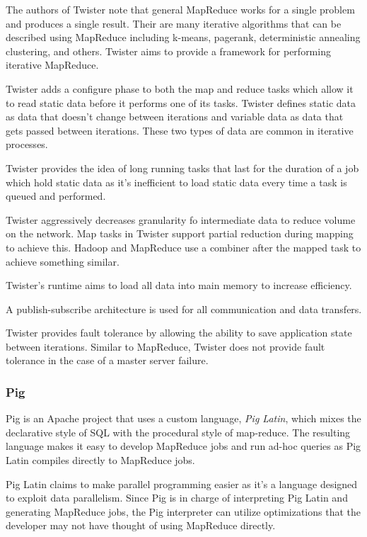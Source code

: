 \documentclass[]{article}
\begin{document}
The authors of Twister note that general MapReduce works for a single problem and produces a single result. Their are many iterative algorithms that can be described using MapReduce including k-means, pagerank, deterministic annealing clustering, and others. Twister aims to provide a framework for performing iterative MapReduce.

Twister adds a configure phase to both the map and reduce tasks which allow it to read static data before it performs one of its tasks. Twister defines static data as data that doesn't change between iterations and variable data as data that gets passed between iterations. These two types of data are common in iterative processes.

Twister provides the idea of long running tasks that last for the duration of a job which hold static data as it's inefficient to load static data every time a task is queued and performed.

Twister aggressively decreases granularity fo intermediate data to reduce volume on the network. Map tasks in Twister support partial reduction during mapping to achieve this. Hadoop and MapReduce use a combiner after the mapped task to achieve something similar.

Twister's runtime aims to load all data into main memory to increase efficiency.

A publish-subscribe architecture is used for all communication and data transfers.

Twister provides fault tolerance by allowing the ability to save application state between iterations. Similar to MapReduce, Twister does not provide fault tolerance in the case of a master server failure.

\subsubsection{Pig}\label{sssec:pig}
Pig\cite{olston2008pig} is an Apache project that uses a custom language, \textit{Pig Latin}, which mixes the declarative style of SQL with the procedural style of map-reduce. The resulting language makes it easy to develop MapReduce jobs and run ad-hoc queries as Pig Latin compiles directly to MapReduce jobs.

Pig Latin claims to make parallel programming easier as it's a language designed to exploit data parallelism. Since Pig is in charge of interpreting Pig Latin and generating MapReduce jobs, the Pig interpreter can utilize optimizations that the developer may not have thought of using MapReduce directly.
\end{document}
